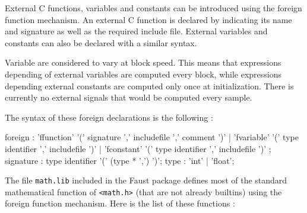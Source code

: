 \documentclass{article}
\begin{document}
External C functions, variables and constants can be introduced using the foreign function mechanism.
An external C function is declared by indicating its name and signature as well as the required include file. External variables and constants can also be declared with a similar syntax. 

Variable are considered to vary at block speed. This means that expressions depending of external variables are computed every block, while expressions depending external constants are computed only once at initialization. There is currently no external signals that would be computed every sample. 

The syntax of these foreign declarations is the following :

\begin{rail}
foreign : 'ffunction' '(' signature ',' includefile ',' comment ')' | 'fvariable' '(' type identifier ',' includefile ')' | 'fconstant' '(' type identifier ',' includefile ')' ;
signature : type identifier '(' (type * ',') ')';
type : 'int' | 'float';
\end{rail}


The file \texttt{math.lib} included in the Faust package defines most of the standard mathematical function of
\texttt{<math.h>} (that are not already builtins) using the foreign function mechanism.
Here is the list of these functions :

\vspace{5 mm}
\end{document}
